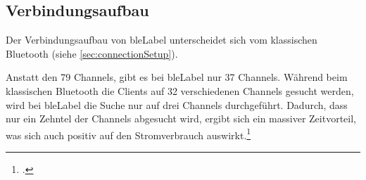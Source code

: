 


\subsection{Verbindungsaufbau}
\label{subsec:bleConnectionSetup}
Der Verbindungsaufbau von \gls{bleLabel} unterscheidet sich vom klassischen Bluetooth (siehe \cref{sec:connectionSetup}).

Anstatt den 79 Channels, gibt es bei \gls{bleLabel} nur 37 Channels. Während beim klassischen Bluetooth die Clients auf 32 verschiedenen Channels gesucht werden, wird bei \gls{bleLabel} die Suche nur auf drei Channels durchgeführt.
Dadurch, dass nur ein Zehntel der Channels abgesucht wird, ergibt sich ein massiver Zeitvorteil, was sich auch positiv auf den Stromverbrauch auswirkt.\footcite[][3]{ti_whitepaper_2015-05-08}


